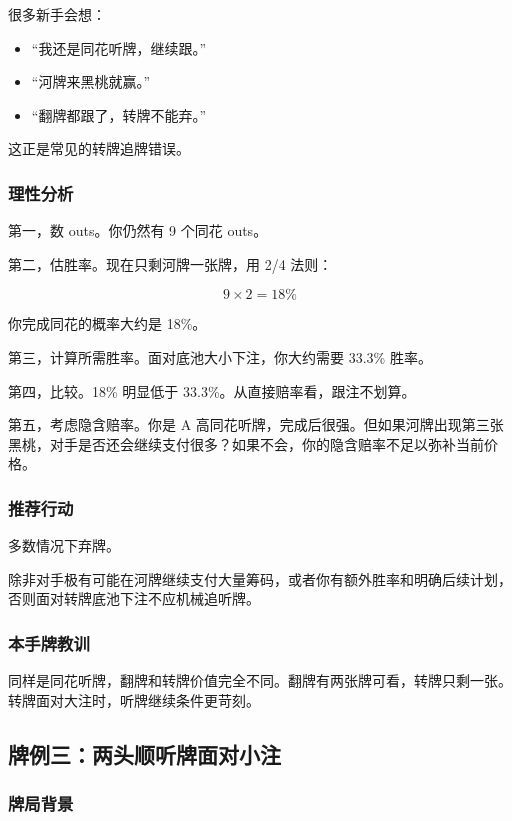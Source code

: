 很多新手会想：

\begin{itemize}
\item “我还是同花听牌，继续跟。”
\item “河牌来黑桃就赢。”
\item “翻牌都跟了，转牌不能弃。”
\end{itemize}

这正是常见的转牌追牌错误。

\subsubsection*{理性分析}

第一，数 outs。你仍然有 9 个同花 outs。

第二，估胜率。现在只剩河牌一张牌，用 2/4 法则：

\[
9 \times 2 = 18\%
\]

你完成同花的概率大约是 18\%。

第三，计算所需胜率。面对底池大小下注，你大约需要 33.3\% 胜率。

第四，比较。18\% 明显低于 33.3\%。从直接赔率看，跟注不划算。

第五，考虑隐含赔率。你是 A 高同花听牌，完成后很强。但如果河牌出现第三张黑桃，对手是否还会继续支付很多？如果不会，你的隐含赔率不足以弥补当前价格。

\subsubsection*{推荐行动}

多数情况下弃牌。

除非对手极有可能在河牌继续支付大量筹码，或者你有额外胜率和明确后续计划，否则面对转牌底池下注不应机械追听牌。

\subsubsection*{本手牌教训}

同样是同花听牌，翻牌和转牌价值完全不同。翻牌有两张牌可看，转牌只剩一张。转牌面对大注时，听牌继续条件更苛刻。

\subsection{牌例三：两头顺听牌面对小注}

\subsubsection*{牌局背景}


